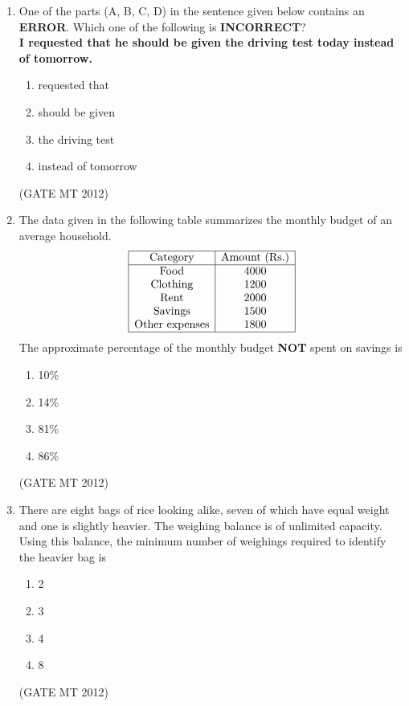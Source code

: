 \documentclass[journal, 11pt, onecolumn]{IEEEtran}
\theoremstyle{remark}
\begin{document}
\begin{enumerate}
\item One of the parts (A, B, C, D) in the sentence given below contains an \textbf{ERROR}. Which one of the following is \textbf{INCORRECT}?\\[0.5em]
\textbf{I requested that he should be given the driving test today instead of tomorrow.}
\begin{multicols}{2}
\begin{enumerate}  
\item requested that
\item should be given
\item the driving test
\item instead of tomorrow
\end{enumerate}
\end{multicols}
\hfill(GATE MT 2012)

\item The data given in the following table summarizes the monthly budget of an average household.
\[
    \begin{array}{|c|c|}
    \hline
    \text{Category} & \text{Amount (Rs.)} \\
    \hline
    \text{Food}        & 4000 \\
    \text{Clothing}    & 1200 \\
    \text{Rent}        & 2000 \\
    \text{Savings}     & 1500 \\
    \text{Other expenses} & 1800 \\
    \hline
    \end{array}
\]
The approximate percentage of the monthly budget \textbf{NOT} spent on savings is
\begin{multicols}{2}
\begin{enumerate}  
\item 10\%
\item 14\%
\item 81\%
\item 86\%
\end{enumerate}
\end{multicols}
\hfill(GATE MT 2012)

\item There are eight bags of rice looking alike, seven of which have equal weight and one is slightly heavier. The weighing balance is of unlimited capacity. Using this balance, the minimum number of weighings required to identify the heavier bag is
\begin{multicols}{2}
\begin{enumerate}  
\item 2
\item 3
\item 4
\item 8
\end{enumerate}
\end{multicols}
\hfill(GATE MT 2012)


\end{enumerate}
\end{document}
